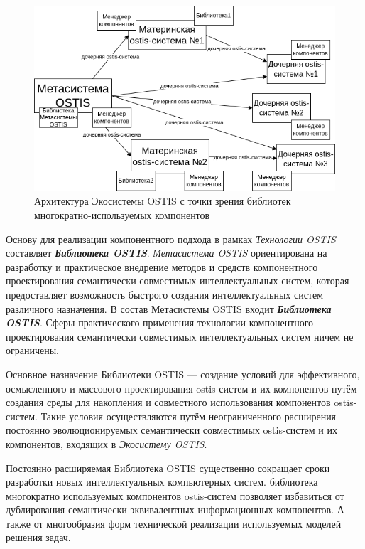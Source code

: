 \begin{figure}[H]
	\includegraphics[scale=0.8]{author/part5/figures/ecosystem_architecture.png}
	\caption{Архитектура Экосистемы OSTIS с точки зрения библиотек многократно-используемых компонентов}
	\label{fig:ecosystem_architecture}
\end{figure}

Основу для реализации компонентного подхода в рамках \textit{Технологии OSTIS} составляет \textbf{\textit{Библиотека OSTIS}}. \textit{Метасистема OSTIS} ориентирована на разработку и практическое внедрение методов и средств компонентного проектирования семантически совместимых интеллектуальных систем, которая предоставляет возможность быстрого создания интеллектуальных систем различного назначения. В состав Метасистемы OSTIS входит \textbf{\textit{Библиотека OSTIS}}. Сферы практического применения технологии компонентного проектирования семантически совместимых интеллектуальных систем ничем не ограничены.

Основное назначение Библиотеки OSTIS --- создание условий для эффективного, осмысленного и массового проектирования ostis-систем и их компонентов путём создания среды для накопления и совместного использования компонентов ostis-систем. Такие условия осуществляются путём неограниченного расширения постоянно эволюционируемых семантически совместимых ostis-систем и их компонентов, входящих в \textit{Экосистему OSTIS}.

Постоянно расширяемая Библиотека OSTIS существенно сокращает сроки разработки новых интеллектуальных компьютерных систем.
библиотека многократно используемых компонентов ostis-систем позволяет избавиться от дублирования семантически эквивалентных информационных компонентов. А также от многообразия форм технической реализации используемых моделей решения задач.

